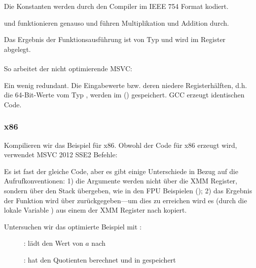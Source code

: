 Die Konstanten werden durch den Compiler im IEEE 754 Format kodiert.

 und  funktionieren genauso und führen Multiplikation und Addition durch.

Das Ergebnis der Funktionsausführung ist von Typ \Tdouble und wird im  Register abgelegt.\\\\
So arbeitet der nicht optimierende MSVC:



Ein wenig redundant. Die Eingabewerte bzw. deren niedere Registerhälften, d.h. die 64-Bit-Werte vom Typ \Tdouble, werden
im () gespeichert.
GCC erzeugt identischen Code.

\subsubsection{x86}
Kompilieren wir das Beispiel für x86. Obwohl der Code für x86 erzeugt wird, verwendet MSVC 2012 SSE2 Befehle:




Es ist fast der gleiche Code, aber es gibt einige Unterschiede in Bezug auf die Aufrufkonventionen:
1) die Argumente werden nicht über die XMM Register, sondern über den Stack übergeben, wie in den FPU Beispielen
();
2) das Ergebnis der Funktion wird über  zurückgegeben---um dies zu erreichen wird es (durch die lokale Variable
) aus einem der XMM Register nach  kopiert.

\clearpage
Untersuchen wir das optimierte Beispiel mit \olly:

\begin{figure}[H]
\centering
{}
\caption{\olly:  lädt den Wert von $a$ nach }
\label{fig:FPU_SIMD_simple_olly1}
\end{figure}

\clearpage
\begin{figure}[H]
\centering
{}
\caption{\olly:  hat den Quotienten berechnet und in  gespeichert} 
\label{fig:FPU_SIMD_simple_olly2}
\end{figure}

